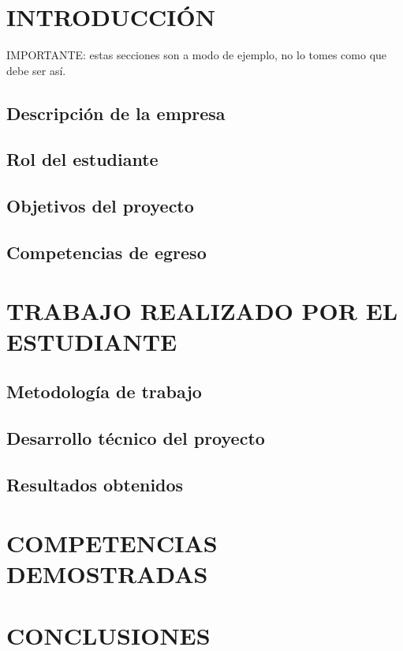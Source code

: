 
\section{INTRODUCCIÓN}

IMPORTANTE: estas secciones son a modo de ejemplo, no lo tomes como que debe ser así.

\subsection{Descripción de la empresa}

\subsection{Rol del estudiante}

\subsection{Objetivos del proyecto}



\subsection{Competencias de egreso}

\newpage
\section{TRABAJO REALIZADO POR EL ESTUDIANTE}
\subsection{Metodología de trabajo} 
\subsection{Desarrollo técnico del proyecto}



\subsection{Resultados obtenidos}


\newpage
\section{COMPETENCIAS DEMOSTRADAS}

\newpage
\section{CONCLUSIONES}
